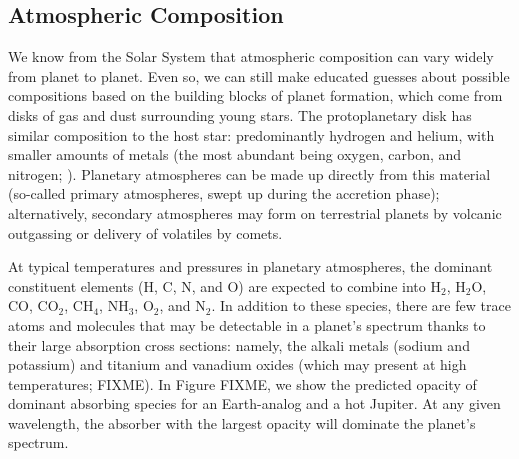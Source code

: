 \documentclass[graybox,natbib,nosecnum]{svmult}
\newcommand{\hbindex}[1]{\hl{#1}\index{#1}}  %
\begin{document}
\subsection{Atmospheric Composition}
We know from the Solar System that atmospheric composition can vary widely from planet to planet. Even so, we can still make educated guesses about possible compositions based on the building blocks of planet formation,  which come from disks of gas and dust surrounding young stars.  The protoplanetary disk has similar composition to the host star: predominantly hydrogen and helium, with smaller amounts of metals (the most abundant being oxygen, carbon, and nitrogen; \citealt{anders89}).  Planetary atmospheres can be made up directly from this material (so-called primary atmospheres, swept up during the accretion phase);  alternatively, secondary atmospheres may form on terrestrial planets by volcanic outgassing or delivery of volatiles by comets.  

At typical temperatures and pressures in planetary atmospheres, the dominant constituent elements (H, C, N, and O) are expected to combine into H$_2$, H$_2$O, CO, CO$_2$, CH$_4$, NH$_3$, O$_2$, and N$_2$.  In addition to these species, there are few trace atoms and molecules that may be detectable in a planet's spectrum thanks to their large absorption cross sections: namely, the alkali metals (sodium and potassium) and titanium and vanadium oxides (which may present at high temperatures; FIXME). In Figure FIXME, we show the predicted opacity of dominant absorbing species for an Earth-analog and a hot Jupiter. At any given wavelength, the absorber with the largest opacity will dominate the planet's spectrum.

\end{document}
